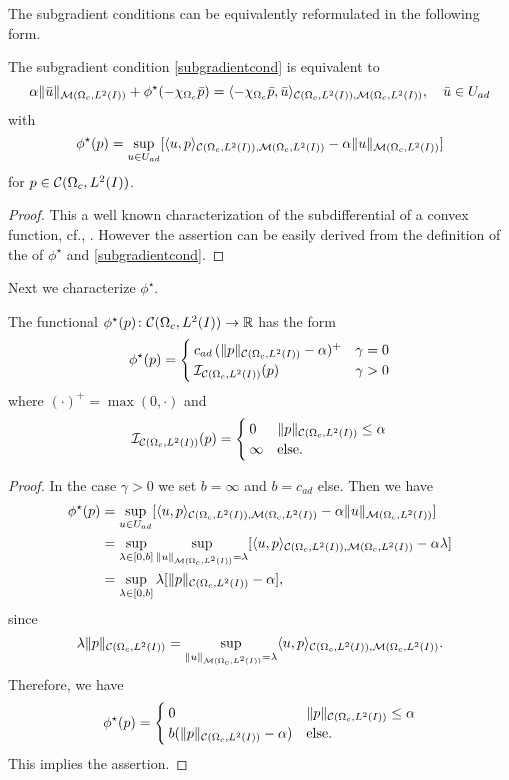 The subgradient conditions can be equivalently reformulated in the following form.
\begin{proposition}\label{prop:equivoc}
The subgradient condition \eqref{subgradientcond} is equivalent to
\begin{equation}\label{equivoc}
\alpha \|\bar u\|_{\M}+\phi^{\star}(-\chi_{\Omega_c}\bar p)=\langle -\chi_{\Omega_c}\bar p,\bar u\rangle_{\C,\M},\quad \bar u\in U_{ad}
\end{equation}
with
\[
\phi^{\star}(p)=\sup_{u\in U_{ad}}[\langle u,p\rangle_{\mathcal{C}(\Omega_c, L^{2}(I)),\mathcal{M}(\Omega_c, L^{2}(I))}-\alpha \|u\|_{\mathcal{M}(\Omega_c, L^{2}(I))}]
\]
for $p\in \mathcal{C}(\Omega_c, L^{2}(I))$.
\end{proposition}
\begin{proof}
This a well known characterization of the subdifferential of a convex function, cf., \cite{EkelandTemam99}.  However the assertion can be easily derived from the definition of the of $\phi^\star$ and \eqref{subgradientcond}.
\qquad \end{proof}

{\color{red} Next we characterize $\phi^\star.$
\begin{lemma}\label{lem:phistar}
The functional $\phi^{\star}(p)\colon \mathcal{C}(\Omega_c, L^{2}(I))\rightarrow \mathbb R$ has the form
\[
\phi^{\star}(p)=
\begin{cases}
c_{ad}\,(\|p\|_{\mathcal{C}(\Omega_c, L^{2}(I))}-\alpha)^+&\gamma=0\\
\mathcal I_{\mathcal{C}(\Omega_c, L^{2}(I))}(p)&\gamma>0
\end{cases}
\]
where $(\cdot)^+ = \operatorname{max}(0,\cdot)$ and
\[
\mathcal I_{\mathcal{C}(\Omega_c, L^{2}(I))}(p)=
\begin{cases}
0&\|p\|_{\mathcal{C}(\Omega_c, L^{2}(I))}\leq \alpha\\
\infty&\text{else.}
\end{cases}
\]
\end{lemma}
\begin{proof}
In the case $\gamma>0$ we set $b=\infty$ and $b=c_{ad}$ else. Then we have
\begin{align*}
\phi^{\star}(p)&=\sup_{u\in U_{ad}}[\langle u,p\rangle_{\mathcal{C}(\Omega_c, L^{2}(I)),\mathcal{M}(\Omega_c, L^{2}(I))}-\alpha \|u\|_{\mathcal{M}(\Omega_c, L^{2}(I))}]\\
&=\sup_{\lambda\in [0,b]}\sup_{\|u\|_{\mathcal{M}(\Omega_c, L^{2}(I))}=\lambda}[\langle u,p\rangle_{\mathcal{C}(\Omega_c, L^{2}(I)),\mathcal{M}(\Omega_c, L^{2}(I))}-\alpha\lambda]\\
&=\sup_{\lambda\in [0,b]}\lambda[\|p\|_{\mathcal{C}(\Omega_c, L^{2}(I))}-\alpha],
\end{align*}
since \[\lambda\|p\|_{\mathcal{C}(\Omega_c, L^{2}(I))}=\sup_{\|u\|_{\mathcal{M}(\Omega_c, L^{2}(I))}=\lambda}\langle u,p\rangle_{\mathcal{C}(\Omega_c, L^{2}(I)),\mathcal{M}(\Omega_c, L^{2}(I))}.\]
Therefore, we have
\[
\phi^\star(p)=
\begin{cases}
0&\|p\|_{\mathcal{C}(\Omega_c, L^{2}(I))}\leq \alpha\\
b(\|p\|_{\mathcal{C}(\Omega_c, L^{2}(I))}-\alpha)&\text{else.}
\end{cases}
\]
This implies the assertion.
\qquad\end{proof}}

